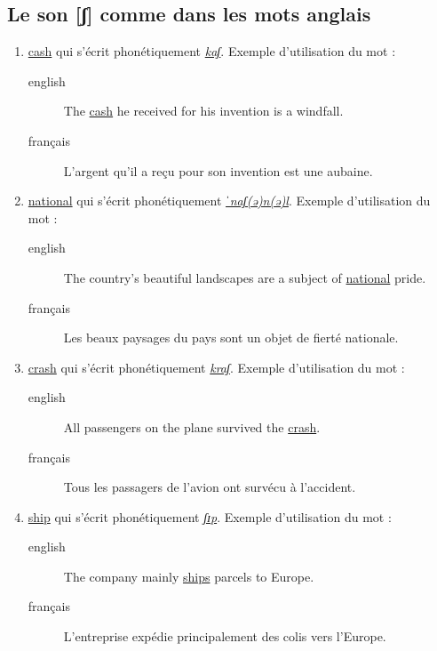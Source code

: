 \subsection{Le son [ʃ] comme dans les mots anglais}
\label{sec:org8d21030}
\begin{enumerate}
\item \href{http://www.wordreference.com/enfr/cash}{cash} qui s'écrit phonétiquement \href{https://en.oxforddictionaries.com/definition/cash}{\emph{kaʃ}}. Exemple d'utilisation du mot :
\begin{description}
\item[{english}] \textenglish{The \href{https://youtu.be/4ahHWROn8M0}{cash} he received for his invention is a windfall.}
\item[{français}] L'argent qu'il a reçu pour son invention est une aubaine.
\end{description}
\item \href{http://www.wordreference.com/enfr/national}{national} qui s'écrit phonétiquement \href{https://en.oxforddictionaries.com/definition/national}{\emph{ˈnaʃ(ə)n(ə)l}}. Exemple d'utilisation du mot : 
\begin{description}
\item[{english}] \textenglish{The country's beautiful landscapes are a subject of
\href{https://youtu.be/xZvzCOQ-TPA}{national} pride.}
\item[{français}] Les beaux paysages du pays sont un objet de fierté
nationale.
\end{description}
\item \href{http://www.wordreference.com/enfr/crash}{crash} qui s'écrit phonétiquement \href{https://en.oxforddictionaries.com/definition/crash}{\emph{kraʃ}}. Exemple d'utilisation du mot :
\begin{description}
\item[{english}] \textenglish{All passengers on the plane survived the \href{https://youtu.be/Jw81bRYUzVM}{crash}.}
\item[{français}] Tous les passagers de l'avion ont survécu à
l'accident.
\end{description}
\item \href{http://www.wordreference.com/enfr/ship}{ship} qui s'écrit phonétiquement \href{https://en.oxforddictionaries.com/definition/ship}{\emph{ʃɪp}}. Exemple d'utilisation du mot :
\begin{description}
\item[{english}] \textenglish{The company mainly \href{https://youtu.be/LLkGsfOfgUw}{ships} parcels to Europe.}
\item[{français}] L'entreprise expédie principalement des colis vers
l'Europe.
\end{description}
\end{enumerate}
